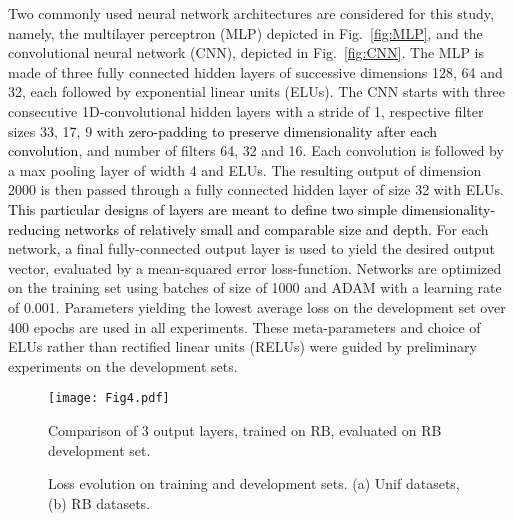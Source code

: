 \documentclass[reprint]{JASA}
\begin{document}
Two commonly used neural network architectures are considered for this study, namely, the multilayer perceptron (MLP) depicted in Fig.~\ref{fig:MLP}, and the convolutional neural network (CNN), depicted in Fig.~\ref{fig:CNN}. The MLP is made of three fully connected hidden layers of successive dimensions 128, 64 and 32, each followed by exponential linear units (ELUs). The CNN starts with three consecutive 1D-convolutional hidden layers with a stride of 1, respective filter sizes 33, 17, 9 with \textcolor{black}{zero-padding to preserve dimensionality after each convolution}, and number of filters 64, 32 and 16. Each convolution is followed by a max pooling layer of width 4 and ELUs. The resulting output of dimension 2000 is then passed through a fully connected hidden layer of size 32 with ELUs. \textcolor{black}{This particular designs of layers are meant to define two simple dimensionality-reducing networks of relatively small and comparable size and depth.}
For each network, a final fully-connected output layer is used to yield the desired output vector, evaluated by a mean-squared error loss-function. Networks are optimized on the training set using batches of size of 1000 and ADAM \cite{kingma2014adam} with a learning rate of 0.001. Parameters yielding the lowest average loss on the development set over 400 epochs are used in all experiments. These meta-parameters and choice of ELUs rather than rectified linear units (RELUs) were guided by preliminary experiments on the development sets.

\begin{figure}[!t]
	\centering
	\texttt{[image: Fig4.pdf]}
	\caption{\label{fig:comparison_outputs} Comparison of 3 output layers, trained on RB, evaluated on RB development set.}
\end{figure}

\begin{figure}[!t]
	\centering
	\caption{\label{fig:loss}Loss evolution on training and development sets.
		(a) Unif datasets, (b) RB datasets.}
\end{figure}
\end{document}

